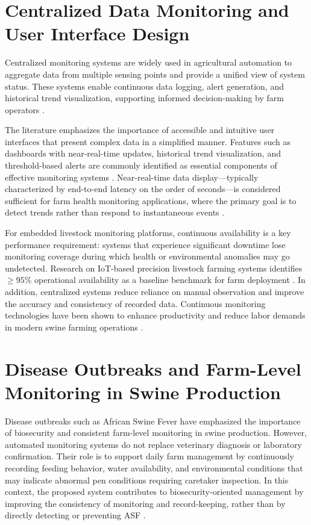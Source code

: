 \section{Centralized Data Monitoring and User Interface Design}

Centralized monitoring systems are widely used in agricultural automation to aggregate data from multiple sensing points and provide a unified view of system status. These systems enable continuous data logging, alert generation, and historical trend visualization, supporting informed decision-making by farm operators \cite{beyondtech2025smart, racewicz2021welfare, everypig_nd, jygatech2026vision}.

The literature emphasizes the importance of accessible and intuitive user interfaces that present complex data in a simplified manner. Features such as dashboards with near-real-time updates, historical trend visualization, and threshold-based alerts are commonly identified as essential components of effective monitoring systems \cite{sadeghi2023improving, everypig_nd, jygatech2026vision}. Near-real-time data display---typically characterized by end-to-end latency on the order of seconds---is considered sufficient for farm health monitoring applications, where the primary goal is to detect trends rather than respond to instantaneous events \cite{carvalho2023iot, beyondtech2025smart}.

For embedded livestock monitoring platforms, continuous availability is a key performance requirement: systems that experience significant downtime lose monitoring coverage during which health or environmental anomalies may go undetected. Research on IoT-based precision livestock farming systems identifies $\geq 95\%$ operational availability as a baseline benchmark for farm deployment \cite{carvalho2023iot, adeoye2025animalia}. In addition, centralized systems reduce reliance on manual observation and improve the accuracy and consistency of recorded data. Continuous monitoring technologies have been shown to enhance productivity and reduce labor demands in modern swine farming operations \cite{lo2025rebooting, livestockproduction2026}.


\section{Disease Outbreaks and Farm-Level Monitoring in Swine Production}

Disease outbreaks such as African Swine Fever have emphasized the importance of biosecurity and consistent farm-level monitoring in swine production. However, automated monitoring systems do not replace veterinary diagnosis or laboratory confirmation. Their role is to support daily farm management by continuously recording feeding behavior, water availability, and environmental conditions that may indicate abnormal pen conditions requiring caretaker inspection. In this context, the proposed system contributes to biosecurity-oriented management by improving the consistency of monitoring and record-keeping, rather than by directly detecting or preventing ASF \cite{healthforanimals2024prevention}.


